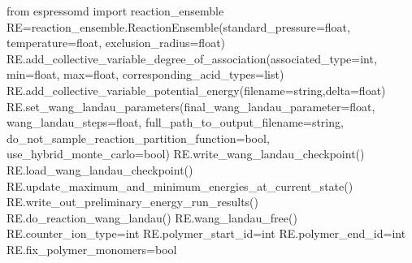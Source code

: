   \begin{pysyntax}
  	from espressomd import reaction_ensemble
  	RE=reaction_ensemble.ReactionEnsemble(standard_pressure=float, temperature=float, exclusion_radius=float)
	RE.add_collective_variable_degree_of_association(associated_type=int, min=float, max=float, corresponding_acid_types=list)
	RE.add_collective_variable_potential_energy(filename=string,delta=float)
	RE.set_wang_landau_parameters(final_wang_landau_parameter=float, wang_landau_steps=float, full_path_to_output_filename=string, do_not_sample_reaction_partition_function=bool, use_hybrid_monte_carlo=bool)
	RE.write_wang_landau_checkpoint()
	RE.load_wang_landau_checkpoint()
	RE.update_maximum_and_minimum_energies_at_current_state()
	RE.write_out_preliminary_energy_run_results()
	RE.do_reaction_wang_landau()
	RE.wang_landau_free()
	RE.counter_ion_type=int
	RE.polymer_start_id=int
	RE.polymer_end_id=int
	RE.fix_polymer_monomers=bool
	\begin{features}
	\end{features}
\end{pysyntax}

